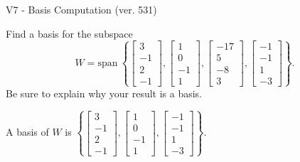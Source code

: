 \begin{exercise}
  \begin{exerciseTitle}V7 - Basis Computation (ver. 531)\end{exerciseTitle}
  \begin{exerciseStatement}
    Find a basis for the subspace 
\[W=\mathrm{span}\ \left\{\left[\begin{array}{r}
3 \\
-1 \\
2 \\
-1
\end{array}\right] , \left[\begin{array}{r}
1 \\
0 \\
-1 \\
1
\end{array}\right] , \left[\begin{array}{r}
-17 \\
5 \\
-8 \\
3
\end{array}\right] , \left[\begin{array}{r}
-1 \\
-1 \\
1 \\
-3
\end{array}\right]\right\}.\]
 Be sure to explain why your result is a basis.


  \end{exerciseStatement}
  \begin{exerciseAnswer}
   A basis of \(W\) is  \(\left\{\left[\begin{array}{r}
3 \\
-1 \\
2 \\
-1
\end{array}\right] , \left[\begin{array}{r}
1 \\
0 \\
-1 \\
1
\end{array}\right] , \left[\begin{array}{r}
-1 \\
-1 \\
1 \\
-3
\end{array}\right]\right\}\).
  


  \end{exerciseAnswer}
\end{exercise}